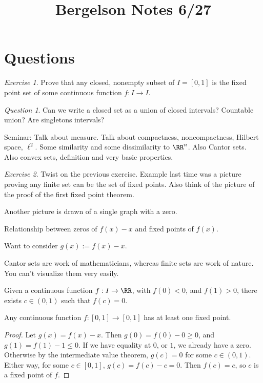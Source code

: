 \documentclass{article}
\title{Bergelson Notes 6/27}
\theoremstyle{remark}
\newtheorem*{question}{Question}
\newtheorem{exercise}{Exercise}
\begin{document}
\maketitle

\section{Questions}

\begin{exercise}
Prove that any closed, nonempty subset of $I=[0,1]$ is the fixed point set of 
some continuous function $f:I\to I$.
\end{exercise}

\begin{question}
    Can we write a closed set as a union of closed intervals?
    Countable union? Are singletons intervals?
\end{question}

Seminar: Talk about measure. Talk about compactness,
noncompactness, Hilbert space, $\ell^2$. 
Some similarity and some dissimilarity to 
$\RR^n$. Also Cantor sets. Also convex sets, definition and
very basic properties.

\begin{exercise}
    Twist on the previous exercise. Example last time was
    a picture proving any finite set can be the set of fixed 
    points. Also think of the picture of the proof of
    the first fixed point theorem. 

    Another picture is drawn of a single graph with a zero.

    Relationship between zeros of $f(x)-x$ and fixed points
    of $f(x)$.

    Want to consider $g(x):=f(x)-x$.
\end{exercise}

Cantor sets are work of mathematicians, whereas finite sets are 
work of nature. You can't visualize them very easily.

\begin{theorem}
    Given a continuous function $f : I\to \RR$, with
    $f(0)<0$, and $f(1)>0$, there exists $c\in (0,1)$
    such that $f(c)=0$.
\end{theorem}


\begin{theorem}
    Any continuous function $f : [0,1] \to [0,1]$ has at least 
    one fixed point.
\end{theorem}
\begin{proof}
    Let $g(x)=f(x)-x$. Then $g(0) = f(0)-0 \ge 0$, and
    $g(1)=f(1)-1\le 0$. If we have equality at $0$, or $1$,
    we already have a zero. Otherwise by the intermediate value
    theorem, $g(c)=0$ for some $c\in (0,1)$. Either way, for some
    $c\in[0,1]$, $g(c)=f(c)-c=0$. Then $f(c)=c$, so $c$ is a
    fixed point of $f$.
\end{proof}
\end{document}
